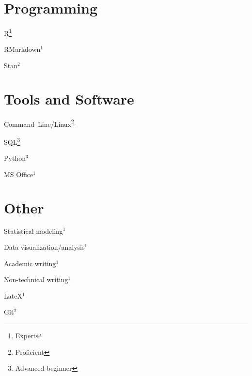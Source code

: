 \documentclass[letterpaper]{resume_config}
\begin{document}
\section{Programming}
\begin{SkillsList}
    \item R\footnote{Expert} 
    \item RMarkdown$^1$
    \item Stan$^2$
\end{SkillsList}

\section{Tools and Software}
\begin{SkillsList}
    \item Command~Line/Linux\footnote{Proficient} 
    \item SQL\footnote{Advanced beginner} 
    \item Python$^3$
    \item MS Office$^1$
\end{SkillsList}

\section{Other}
\begin{SkillsList}
    \item Statistical modeling$^1$
    \item Data visualization/analysis$^1$ 
    \item Academic writing$^1$
    \item Non-technical writing$^1$
    \item LateX$^1$ 
    \item Git$^2$
\end{SkillsList}
\end{document}
